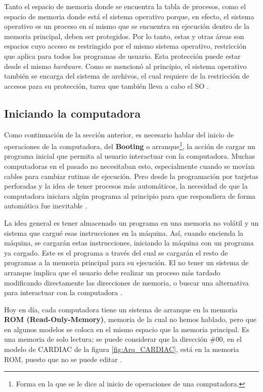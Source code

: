 \documentclass[letterpaper,12pt,oneside]{book}
\begin{document}
		Tanto el espacio de memoria donde se encuentra la tabla de procesos, como el espacio de memoria donde está el sistema operativo porque,
		en efecto, el sistema operativo es un proceso en sí mismo que se encuentra en ejecución dentro de la memoria principal, deben ser protegidos.
		Por lo tanto, estas y otras áreas son espacios cuyo acceso es restringido por el mismo sistema operativo, restricción que aplica para todos los 	
		programas de usuario. Esta protección puede estar desde el mismo \textit{hardware}. Como se mencionó al principio, el sistema operativo también 
		se encarga del sistema
		de archivos, el cual requiere de la restricción de accesos para su protección, tarea que también lleva a cabo el SO 
		\cite{tanenbaum_modern_2002}.
		 
		\subsection{Iniciando la computadora}
		
		Como continuación de la sección anterior, es necesario hablar del inicio de operaciones de la computadora, del \textbf{Booting} o arranque\footnote{Forma
		en la que se le dice al inicio de operaciones de una computadora.}, la acción de cargar un programa inicial que permita al usuario interactuar con
		la computadora. Muchas computadoras en el pasado no necesitaban esto, especialmente cuando se movían cables
		para cambiar rutinas de ejecución. Pero desde la programación por tarjetas perforadas y la idea de tener procesos más automáticos, la necesidad
		de que la computadora iniciara algún programa al principio para que respondiera de forma automática fue inevitable \cite{tanenbaum_modern_2002}.

        La idea general es tener almacenado un programa en una memoria no volátil y un sistema que cargué esas instrucciones en la máquina. Así,
cuando encienda la máquina, se cargarán estas instrucciones, iniciando la máquina con un programa ya cargado. Este es el programa a través del cual
se cargarán el resto de programas a la memoria principal para su ejecución. El no tener un sistema de arranque implica que el usuario debe  realizar un proceso más tardado modificando directamente las direcciones de memoria, o buscar una alternativa para interactuar con la computadora \cite{tanenbaum_modern_2002}.
  
        Hoy en día, cada computadora
		tiene un sistema de arranque  en la memoria \textbf{ROM (Read-Only-Memory)}, memoria de la cual no hemos hablado, pero que en algunos modelos
		se coloca en el mismo espacio que la memoria principal. Es una memoria de solo lectura; se puede considerar que la dirección
		\#00, en el modelo de CARDIAC de la figura \ref{fig:Arq_CARDIAC}, está  en la memoria ROM, puesto que no se puede editar \cite{tanenbaum_modern_2002}.
  
\end{document}
